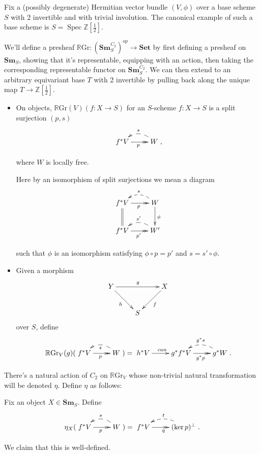 \documentclass[edeposit,fullpage]{uiucthesis2009}
\newcommand{\Z}{\mathbb Z}
\newcommand{\RGr}{\mathbb R\mathrm{Gr}}
\newcommand{\Set}{\mathbf{Set}}
\newcommand{\Sm}[1]{\mathbf{Sm}_{#1}}
\DeclareMathOperator{\Spec}{Spec}
\theoremstyle{plain}
\numberwithin{lemma}{section}
\theoremstyle{definition}
\begin{document}
Fix a (possibly degenerate) Hermitian vector bundle $(V,\phi)$ over a
base scheme $S$ with 2 invertible and with trivial
involution. The canonical example of such a base scheme is $S = \Spec \Z[\frac{1}{2}]$.

We'll define a presheaf $\RGr : (\Sm{S}^{C_2})^{op} \rightarrow \Set$
by first defining a presheaf on $\Sm{S}$, showing that it's
representable, equipping with an action, then taking the corresponding
representable functor on $\Sm{S}^{C_2}$. We can then extend to an
arbitrary equivariant base $T$ with 2 invertible by pulling back along the unique map $T
\rightarrow \Z[\frac{1}{2}]$.

\begin{itemize}
\item On objects, $\RGr(V)(f: X \rightarrow S)$ for an $S$-scheme $f :
  X \rightarrow S$ is a split surjection $(p,s)$
\[
\xymatrix{f^*V \ar@{>>}[r]_p & \ar@/_1.0pc/@{-->}[l]_sW},
\]

where $W$ is locally free. 

Here by an isomorphism of split surjections we mean a diagram
\[
\xymatrix{f^*V \ar@{>>}[r]_p \ar@{=}[d]& \ar@/_1.0pc/@{-->}[l]_sW \ar[d]^\phi\\
f^*V \ar@{>>}[r]_{p'} & \ar@/_1.0pc/@{-->}[l]_{s'}W'}
\]

such that $\phi$ is an isomorphism satisfying $\phi \circ p = p'$ and $s = s'\circ \phi$.

\item Given a morphism 
\[
\xymatrix{Y\ar[dr]_h \ar[rr]^g &&X\ar[dl]^f\\& S&}
\]
over $S$, define
\[
\RGr_V(g)(\xymatrix{f^*V \ar@{>>}[r]_p & \ar@/_1.0pc/@{-->}[l]^sW}) = 
\xymatrix{h^*V \ar[r]^{can} & g^*f^*V \ar@{>>}[r]_{g^*p} &
  \ar@/_1.0pc/@{-->}[l]_{g^*s} g^*W}.
\]
\end{itemize}
There's a natural action of $C_2$ on $\RGr_V$ whose non-trivial
natural transformation will be denoted $\eta$. Define $\eta$ as
follows: 

 Fix an object $X \in \Sm{S}$. Define
\[
\eta_X(\xymatrix{f^*V \ar@{>>}[r]_p & \ar@/_1.0pc/@{-->}[l]_sW}) =
\xymatrix{f^*V \ar@{>>}[r]_q & \ar@/_1.0pc/@{-->}[l]_t(\ker p)^\perp}.
\]

We claim that this is well-defined. %
\end{document}
